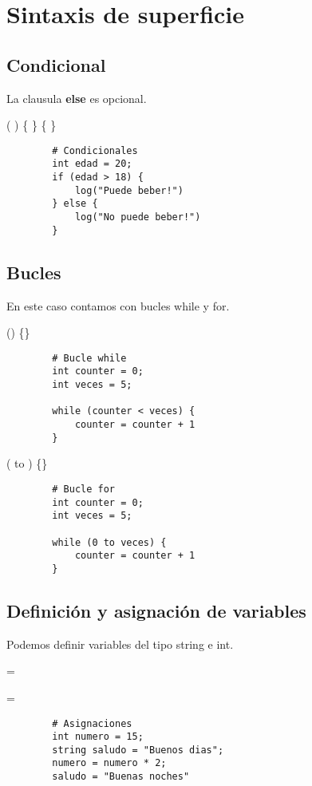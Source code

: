 \documentclass{article}
\begin{document}
    \section{Sintaxis de superficie}
    \subsection{Condicional}
    La clausula \textbf{else} es opcional. \par
    \begin{center}
         (  ) 
        \{  \}  \{  \}
    \end{center}
    \begin{lstlisting}
        # Condicionales
        int edad = 20;
        if (edad > 18) {
            log("Puede beber!")
        } else {
            log("No puede beber!")
        }
    \end{lstlisting}
    \subsection{Bucles}
    En este caso contamos con bucles while y for.\par
    \begin{center}
         () \{\}
    \end{center}
    \begin{lstlisting}
        # Bucle while
        int counter = 0;
        int veces = 5;
        
        while (counter < veces) {
            counter = counter + 1
        }

    \end{lstlisting}
    \begin{center}
         ( to ) \{\}
    \end{center}
    \begin{lstlisting}
        # Bucle for
        int counter = 0;
        int veces = 5;
        
        while (0 to veces) {
            counter = counter + 1
        }

    \end{lstlisting}
    \newpage
    \subsection{Definición y asignación de variables}
    Podemos definir variables del tipo string e int.\par
    \begin{center}
          = 
    \end{center}
    \begin{center}
          = 
    \end{center}
    \begin{lstlisting}
        # Asignaciones
        int numero = 15;
        string saludo = "Buenos dias";
        numero = numero * 2;
        saludo = "Buenas noches"
    \end{lstlisting}
\end{document}
